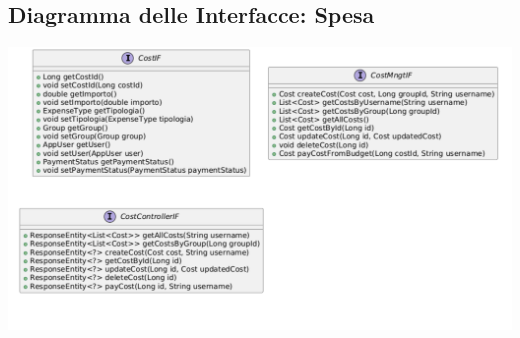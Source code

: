 \subsection{Diagramma delle Interfacce: Spesa}
\hspace{1pt}
\begin{center}
    \includegraphics[scale=0.4]{images/InterfaceUML-iterazione2.png}
\end{center}
